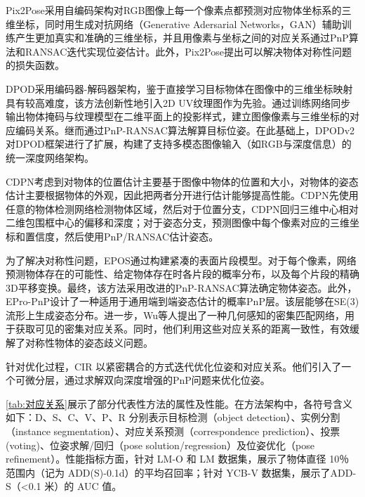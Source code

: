\par Pix2Pose\cite{park2019pix2pose}采用自编码架构对RGB图像上每一个像素点都预测对应物体坐标系的三维坐标，同时用生成对抗网络（Generative Adersarial Networks，GAN）辅助训练产生更加真实和准确的三维坐标，并且用像素与坐标之间的对应关系通过PnP算法和RANSAC迭代实现位姿估计。此外，Pix2Pose提出可以解决物体对称性问题的损失函数。

\par DPOD\cite{zakharov2019dpod}采用编码器-解码器架构，鉴于直接学习目标物体在图像中的三维坐标映射具有较高难度，该方法创新性地引入2D UV纹理图作为先验。通过训练网络同步输出物体掩码与纹理模型在二维平面上的投影样式，建立图像像素与三维坐标的对应编码关系。继而通过PnP-RANSAC算法解算目标位姿。在此基础上，DPODv2\cite{Shugurov2021DPODv2}对DPOD框架\cite{zakharov2019dpod}进行了扩展，构建了支持多模态图像输入（如RGB与深度信息）的统一深度网络架构。

\par CDPN\cite{li2019cdpn}考虑到对物体的位置估计主要基于图像中物体的位置和大小，对物体的姿态估计主要根据物体的外观，因此把两者分开进行估计能够提高性能。CDPN先使用任意的物体检测网络检测物体区域，然后对于位置分支，CDPN回归三维中心相对二维包围框中心的偏移和深度；对于姿态分支，预测图像中每个像素对应的三维坐标和置信度，然后使用PnP/RANSAC\cite{RANSAC}估计姿态。

\par 为了解决对称性问题，EPOS\cite{hodan2020epos}通过构建紧凑的表面片段模型。对于每个像素，网络预测物体存在的可能性、给定物体存在时各片段的概率分布，以及每个片段的精确3D平移变换。最终，该方法采用改进的PnP-RANSAC算法\cite{RANSAC}确定物体姿态。此外，EPro-PnP\cite{Chen2022EPro_PnP}设计了一种适用于通用端到端姿态估计的概率PnP层。该层能够在SE(3)流形上生成姿态分布。进一步，Wu等人\cite{wu2023geometric}提出了一种几何感知的密集匹配网络，用于获取可见的密集对应关系。同时，他们利用这些对应关系的距离一致性，有效缓解了对称性物体的姿态歧义问题。

\par 针对优化过程，CIR\cite{lipson2022coupled} 以紧密耦合的方式迭代优化位姿和对应关系。他们引入了一个可微分层，通过求解双向深度增强的PnP问题来优化位姿。

\autoref{tab:对应关系}展示了部分代表性方法的属性及性能。在方法架构中，各符号含义如下：D、S、C、V、P、R 分别表示目标检测（object detection）、实例分割（instance segmentation）、对应关系预测（correspondence prediction）、投票(voting)、位姿求解/回归（pose solution/regression）及位姿优化（pose refinement）。性能指标方面，针对 LM-O 和 LM 数据集，展示了物体直径 10％ 范围内（记为 ADD(S)-0.1d）的平均召回率；针对 YCB-V 数据集，展示了ADD-S（<0.1 米）的 AUC 值。

